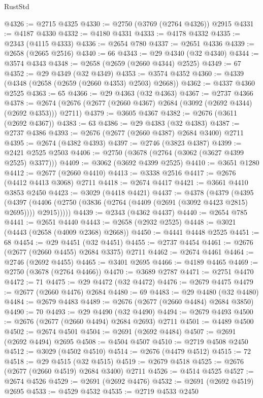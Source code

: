 \begin{lexlean}{RustStd}
\begin{coremodule}
@4326 := @2715 @4325
@4330 := @2750 (@3769 (@2764 @4326)) @2915
@4331 := @4187 @4330
@4332 := @4180 @4331
@4333 := @4178 @4332
@4335 := @2343 (@4115 @4333)
@4336 := @2654 @780
@4337 := @2651 @4336
@4339 := @2658 (@2665 @2516)
@4340 := 66
@4343 := @29 @4340 (@32 @4340)
@4344 := @3574 @4343
@4348 := @2658 (@2659 (@2660 @4344) @2525)
@4349 := 67
@4352 := @29 @4349 (@32 @4349)
@4353 := @3574 @4352
@4360 := @4339 (@4348 (@2658 (@2659 (@2660 @4353) @2503) @2668))
@4362 := @4337 @4360 @2525
@4363 := 65
@4366 := @29 @4363 (@32 @4363)
@4367 := @2737 @4366
@4378 := @2674 (@2676 (@2677 (@2660 @4367) @2684 (@3092 (@2692 @4344) (@2692 @4353))) @2711)
@4379 := @3605 @4367
@4382 := @2676 (@3611 (@2692 @4367))
@4383 := 63
@4386 := @29 @4383 (@32 @4383)
@4387 := @2737 @4386
@4393 := @2676 (@2677 (@2660 @4387) @2684 @3400) @2711
@4395 := @2674 (@4382 @4393)
@4397 := @2746 (@3823 @4387)
@4399 := @2421 @2525 @2503
@4406 := @2750 (@3678 (@2764 (@3062 (@3627 @4399 @2525) @3377)))
@4409 := @3062 (@3692 @4399 @2525)
@4410 := @3651 @1280
@4412 := @2677 (@2660 @4410)
@4413 := @3338 @2516
@4417 := @2676 (@4412 @4413 @3068) @2711
@4418 := @2674 @4417
@4421 := @3661 @4410 @3853 @2450
@4423 := @3029 (@4418 @4421)
@4437 := @4378
    (@4379
      (@4395
        (@4397 (@4406 (@2750 (@3836 (@2764 (@4409 (@2691 (@3092 @4423 @2815) @2695)))) @2915)))))
@4439 := @2343 (@4362 @4437)
@4440 := @2654 @785
@4441 := @2651 @4440
@4443 := @2658 (@2932 @2525)
@4448 := @3021 (@4443 (@2658 (@4009 @2368) @2668))
@4450 := @4441 @4448 @2525
@4451 := 68
@4454 := @29 @4451 (@32 @4451)
@4455 := @2737 @4454
@4461 := @2676 (@2677 (@2660 @4455) @2684 @3375) @2711
@4462 := @2674 @4461
@4464 := @2746 (@2692 @4455)
@4465 := @3401 @2695
@4466 := @4189 @4465
@4469 := @2750 (@3678 (@2764 @4466))
@4470 := @3689 @2787
@4471 := @2751 @4470
@4472 := 71
@4475 := @29 @4472 (@32 @4472)
@4476 := @2679 @4475
@4479 := @2677 (@2660 @4476) @2684
@4480 := 69
@4483 := @29 @4480 (@32 @4480)
@4484 := @2679 @4483
@4489 := @2676 (@2677 (@2660 @4484) @2684 @3850)
@4490 := 70
@4493 := @29 @4490 (@32 @4490)
@4494 := @2679 @4493
@4500 := @2676 (@2677 (@2660 @4494) @2684 @2693) @2711
@4501 := @4489 @4500
@4502 := @2674 @4501
@4504 := @2691 (@2692 @4484)
@4507 := @2691 (@2692 @4494) @2695
@4508 := @4504 @4507
@4510 := @2719 @4508 @2450
@4512 := @3029 (@4502 @4510)
@4514 := @2676 (@4479 @4512)
@4515 := 72
@4518 := @29 @4515 (@32 @4515)
@4519 := @2679 @4518
@4525 := @2676 (@2677 (@2660 @4519) @2684 @3400) @2711
@4526 := @4514 @4525
@4527 := @2674 @4526
@4529 := @2691 (@2692 @4476)
@4532 := @2691 (@2692 @4519) @2695
@4533 := @4529 @4532
@4535 := @2719 @4533 @2450

\end{coremodule}
\end{lexlean}
